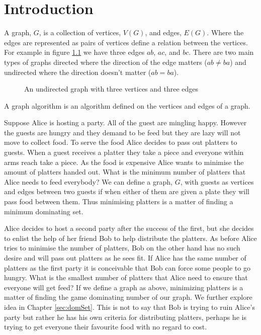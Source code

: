 \chapter{Introduction}
A graph, $G$, is a collection of vertices, $V(G)$, and edges, $E(G)$. Where the edges are represented as pairs of vertices define a relation between the vertices. For example in figure \ref{fig:k3} we have three edges $ab$, $ac$, and $bc$. There are two main types of graphs directed where the direction of the edge matters ($ab\neq ba$) and undirected where the direction doesn't matter ($ab=ba$).

\begin{figure}[h]
    \centering
{}
    \caption{An undirected graph with three vertices and three edges}
\label{fig:k3}
\end{figure}
   
A graph algorithm is an algorithm defined on the vertices and edges of a graph. 

Suppose Alice is hosting a party. All of the guest are mingling happy. However the guests are hungry and they demand to be feed but they are lazy will not move to collect food. To serve the food Alice decides to pass out platters to guests. When a guest receives a platter they take a piece and everyone within arms reach take a piece. As the food is expensive Alice wants to minimise the amount of platters handed out. What is the minimum number of platters that Alice needs to feed everybody? 
We can define a graph, $G$, with guests as vertices and edges between two guests if when either of them are given a plate they will pass food between them. Thus minimising platters is a matter of finding a minimum dominating set.

Alice decides to host a second party after the success of the first, but she decides to enlist the help of her friend Bob to help distribute the platters. As before Alice tries to minimise the number of platters, Bob on the other hand has no such desire and will pass out platters as he sees fit. If Alice has the same number of platters as the first party it is conceivable that Bob can force some people to go hungry. What is the smallest number of platters that Alice need to ensure that everyone will get feed? 
If we define a graph as above, minimizing platters is a matter of finding the game dominating number of our graph. We further explore idea in Chapter \ref{sec:domSet}.
This is not to say that Bob is trying to ruin Alice's party but rather he has his own criteria for distributing platters, perhaps he is trying to get everyone their favourite food with no regard to cost. 

